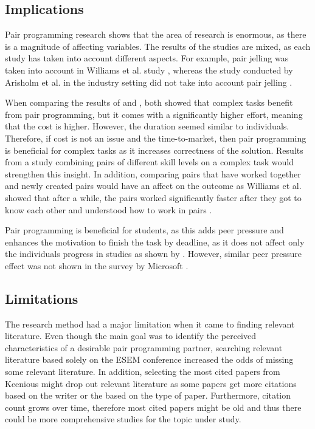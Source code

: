 \documentclass[conference]{IEEEtran}
\begin{document}
\subsection{Implications}

Pair programming research shows that the area of research is enormous, as there is a magnitude of affecting variables. The results of the studies are mixed, as each study has taken into account different aspects. For example, pair jelling was taken into account in Williams et al. study \cite{Williams2000Strengthening}, whereas the study conducted by Arisholm et al. in the industry setting did not take into account pair jelling \cite{Arisholm2007Evaluating}.

When comparing the results of \cite{Arisholm2007Evaluating} and \cite{10.1145/1159733.1159749}, both showed that complex tasks benefit from pair programming, but it comes with a significantly higher effort, meaning that the cost is higher. However, the duration seemed similar to individuals. Therefore, if cost is not an issue and the time-to-market, then pair programming is beneficial for complex tasks as it increases correctness of the solution. Results from a study combining pairs of different skill levels on a complex task would strengthen this insight. In addition, comparing pairs that have worked together and newly created pairs would have an affect on the outcome as Williams et al. showed that after a while, the pairs worked significantly faster after they got to know each other and understood how to work in pairs \cite{Williams2000Strengthening}.

Pair programming is beneficial for students, as this adds peer pressure and enhances the motivation to finish the task by deadline, as it does not affect only the individuals progress in studies as shown by \cite{Williams2000Strengthening}. However, similar peer pressure effect was not shown in the survey by Microsoft \cite{10.1145/1414004.1414026}. 


\subsection{Limitations}

The research method had a major limitation when it came to finding relevant literature. Even though the main goal was to identify the perceived characteristics of a desirable pair programming partner, searching relevant literature based solely on the ESEM conference increased the odds of missing some relevant literature. In addition, selecting the most cited papers from Keenious might drop out relevant literature as some papers get more citations based on the writer or the based on the type of paper. Furthermore, citation count grows over time, therefore most cited papers might be old and thus there could be more comprehensive studies for the topic under study.
\end{document}
